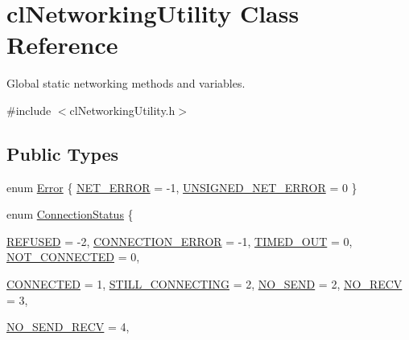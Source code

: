 \hypertarget{classcl_networking_utility}{
\section{clNetworkingUtility Class Reference}
\label{classcl_networking_utility}
}


Global static networking methods and variables.  




{\ttfamily \#include $<$clNetworkingUtility.h$>$}

\subsection*{Public Types}
\begin{DoxyCompactItemize}
\item 
enum \hyperlink{classcl_networking_utility_abd62983eb0ed56370b14bd8fe26ff6d3}{Error} \{ \hyperlink{classcl_networking_utility_abd62983eb0ed56370b14bd8fe26ff6d3af2155f40db817b2899720ebec3e0a463}{NET\_\-ERROR} =  -\/1, 
\hyperlink{classcl_networking_utility_abd62983eb0ed56370b14bd8fe26ff6d3ac914d42470ea7c5a72273f0992eaa09d}{UNSIGNED\_\-NET\_\-ERROR} =  0
 \}
\item 
enum \hyperlink{classcl_networking_utility_a15dd34683154e07d5843f8f5432fec6d}{ConnectionStatus} \{ \par
\hyperlink{classcl_networking_utility_a15dd34683154e07d5843f8f5432fec6da1a0333d6bbf1103cfcdfa4621133e3a4}{REFUSED} =  -\/2, 
\hyperlink{classcl_networking_utility_a15dd34683154e07d5843f8f5432fec6dafafd46790b41dc51910c2cc598024480}{CONNECTION\_\-ERROR} =  -\/1, 
\hyperlink{classcl_networking_utility_a15dd34683154e07d5843f8f5432fec6da4ab4eb1108087cf8c17bff8585cf8270}{TIMED\_\-OUT} =  0, 
\hyperlink{classcl_networking_utility_a15dd34683154e07d5843f8f5432fec6da7ea7f5aa34e94ec65b905c2a37610583}{NOT\_\-CONNECTED} =  0, 
\par
\hyperlink{classcl_networking_utility_a15dd34683154e07d5843f8f5432fec6da91a3fd8751354e5c4f32181268627d9f}{CONNECTED} =  1, 
\hyperlink{classcl_networking_utility_a15dd34683154e07d5843f8f5432fec6da8ffcc0a72b9ea4ec527c5bc89c2c890e}{STILL\_\-CONNECTING} =  2, 
\hyperlink{classcl_networking_utility_a15dd34683154e07d5843f8f5432fec6dab8241425bb2dc77be7422346559bbb30}{NO\_\-SEND} =  2, 
\hyperlink{classcl_networking_utility_a15dd34683154e07d5843f8f5432fec6daf36e05d04ad267b00184a32d654c3989}{NO\_\-RECV} =  3, 
\par
\hyperlink{classcl_networking_utility_a15dd34683154e07d5843f8f5432fec6da049f6833fe3ed9d08cfe5047078b73e3}{NO\_\-SEND\_\-RECV} =  4, 

\end{DoxyCompactItemize}
